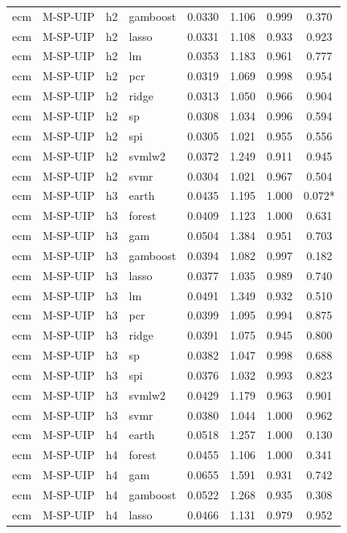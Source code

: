 \begin{ThreePartTable}
\begin{longtable}[t]{llclcccc}
ecm & M-SP-UIP & h2 & gamboost & 0.0330 & 1.106 & 0.999 & 0.370\\
ecm & M-SP-UIP & h2 & lasso & 0.0331 & 1.108 & 0.933 & 0.923\\
ecm & M-SP-UIP & h2 & lm & 0.0353 & 1.183 & 0.961 & 0.777\\
ecm & M-SP-UIP & h2 & pcr & 0.0319 & 1.069 & 0.998 & 0.954\\
ecm & M-SP-UIP & h2 & ridge & 0.0313 & 1.050 & 0.966 & 0.904\\
ecm & M-SP-UIP & h2 & sp & 0.0308 & 1.034 & 0.996 & 0.594\\
ecm & M-SP-UIP & h2 & spi & 0.0305 & 1.021 & 0.955 & 0.556\\
ecm & M-SP-UIP & h2 & svmlw2 & 0.0372 & 1.249 & 0.911 & 0.945\\
ecm & M-SP-UIP & h2 & svmr & 0.0304 & 1.021 & 0.967 & 0.504\\
\addlinespace
ecm & M-SP-UIP & h3 & earth & 0.0435 & 1.195 & 1.000 & 0.072*\\
ecm & M-SP-UIP & h3 & forest & 0.0409 & 1.123 & 1.000 & 0.631\\
ecm & M-SP-UIP & h3 & gam & 0.0504 & 1.384 & 0.951 & 0.703\\
ecm & M-SP-UIP & h3 & gamboost & 0.0394 & 1.082 & 0.997 & 0.182\\
ecm & M-SP-UIP & h3 & lasso & 0.0377 & 1.035 & 0.989 & 0.740\\
ecm & M-SP-UIP & h3 & lm & 0.0491 & 1.349 & 0.932 & 0.510\\
ecm & M-SP-UIP & h3 & pcr & 0.0399 & 1.095 & 0.994 & 0.875\\
ecm & M-SP-UIP & h3 & ridge & 0.0391 & 1.075 & 0.945 & 0.800\\
ecm & M-SP-UIP & h3 & sp & 0.0382 & 1.047 & 0.998 & 0.688\\
ecm & M-SP-UIP & h3 & spi & 0.0376 & 1.032 & 0.993 & 0.823\\
ecm & M-SP-UIP & h3 & svmlw2 & 0.0429 & 1.179 & 0.963 & 0.901\\
ecm & M-SP-UIP & h3 & svmr & 0.0380 & 1.044 & 1.000 & 0.962\\
\addlinespace
ecm & M-SP-UIP & h4 & earth & 0.0518 & 1.257 & 1.000 & 0.130\\
ecm & M-SP-UIP & h4 & forest & 0.0455 & 1.106 & 1.000 & 0.341\\
ecm & M-SP-UIP & h4 & gam & 0.0655 & 1.591 & 0.931 & 0.742\\
ecm & M-SP-UIP & h4 & gamboost & 0.0522 & 1.268 & 0.935 & 0.308\\
ecm & M-SP-UIP & h4 & lasso & 0.0466 & 1.131 & 0.979 & 0.952\\

\end{longtable}
\end{ThreePartTable}
